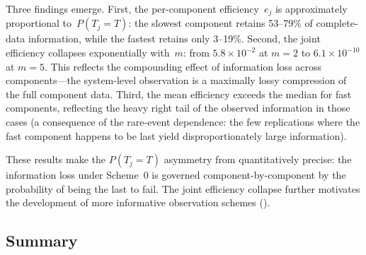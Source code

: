 Three findings emerge.  First, the per-component efficiency~$e_j$ is
approximately proportional to~$P(T_j = T)$: the slowest component
retains 53--79\% of complete-data information, while the fastest retains
only 3--19\%.  Second, the joint efficiency collapses exponentially
with~$m$: from $5.8 \times 10^{-2}$ at $m = 2$ to $6.1 \times 10^{-10}$
at $m = 5$.  This reflects the compounding effect of information loss
across components---the system-level observation is a maximally lossy
compression of the full component data.  Third, the mean efficiency
exceeds the median for fast components, reflecting the heavy right tail
of the observed information in those cases (a consequence of the
rare-event dependence: the few replications where the fast component
happens to be last yield disproportionately large information).

These results make the $P(T_j = T)$ asymmetry from
 quantitatively precise: the information
loss under Scheme~0 is governed component-by-component by the
probability of being the last to fail.  The joint efficiency collapse
further motivates the development of more informative observation
schemes ().


\subsection{Summary}
\label{sec:sim-summary}

